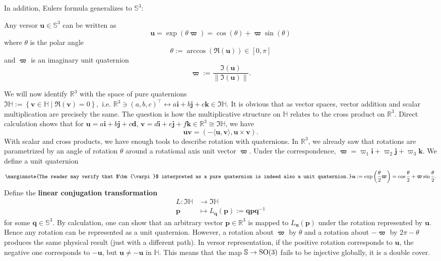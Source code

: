 In addition, Eulers formula generalizes to $\mathbb{S}^3$:
\begin{prop}
    Any versor $\bm{u} \in \mathbb{S}^3$ can be written as 
    \[
        \bm{u}=\exp(\theta \bm{\varpi}) = \cos (\theta) + \bm{\varpi} \sin(\theta)
    \] where $\theta$ is the polar angle \[
    \theta := \arccos(\Re(\bm{u})) \in [0, \pi]
\] and  $\bm{\varpi}$ is an imaginary unit quaternion
\[
    \bm{\varpi}:= \frac{\Im(\bm{u})}{\|\Im(\bm{u})\|}
.\] 
\end{prop}
We will now identify $\mathbb{R}^3$ with the space of pure quaternions \\$\Im \mathbb{H}:= \left\{\bm{v} \in \mathbb{H} \mid \Re(\bm{v})=0 \right\},$ i.e. $\mathbb{R}^3 \ni (a,b,c)^\top \leftrightarrow a \bm{i}+b\bm{j}+c\bm{k} \in \Im \mathbb{H}.$ It is obvious that as vector spaces, vector addition and scalar multiplication are precisely the same. The question is how the multiplicative structure on $\mathbb{H}$ relates to the cross product on $\mathbb{R}^3$. Direct calculation shows that for $\bm{u}=a \bm{i}+b\bm{j}+c\bm{d},\, \bm{v}=d \bm{i}+e \bm{j}+f\bm{k} \in \mathbb{R}^3 \cong \Im \mathbb{H}$, we have 
\[
    \bm{u}\bm{v}=(- \langle \bm{u} ,\bm{v}  \rangle, \bm{u} \times \bm{v}) 
.\] 
With scalar and cross products, we have enough tools to describe rotation with quaternions. In $\mathbb{R}^3$, we already saw that rotations are parametrized by an angle of rotation $\theta$ around a rotational axis unit vector $\bm{\varpi}$. Under the correspondence, $\bm{\varpi}=\varpi_1 \bm{i}+\varpi_2\bm{j}+\varpi_3 \bm{k}$. We define a unit quaternion \[
    \marginnote{The reader may verify that $\bm{\varpi}$ interpreted as a pure quaternion is indeed also a unit quaternion.}
    \bm{u} := \exp\left(\frac{\theta}{2} \bm{\varpi} \right)=\cos \frac{\theta}{2}+ \bm{\varpi} \sin \frac{\theta}{2}
.\] Define the \textbf{linear conjugation transformation} 
\begin{align*}
    L: \Im \mathbb{H} &\to \Im \mathbb{H}\\
    \bm{p} &\mapsto L_{\bm{q}}(\bm{p}):=\bm{q}\bm{p}\bm{q}^{-1}
\end{align*}
for some $\bm{q} \in \mathbb{S}^3$. By calculation, one can show that an arbitrary vector $\bm{p} \in \mathbb{R}^3$ is mapped to $L_{\bm{u}}(\bm{p})$ under the rotation represented by $\bm{u}$. Hence any rotation can be represented as a unit quaternion. However, a rotation about $\bm{\varpi}$ by $\theta$ and a rotation about $-\bm{\varpi}$ by $2\pi - \theta$ produces the same physical result (just with a different path). In versor representation, if the positive rotation corresponds to $\bm{u}$, the negative one corresponds to $-\bm{u}$, but $\bm{u}\neq -\bm{u}$ in $\mathbb{H}$. This means that the map $\mathbb{S}\to \operatorname{SO}(3)$ fails to be injective globally, it is a double cover. 
